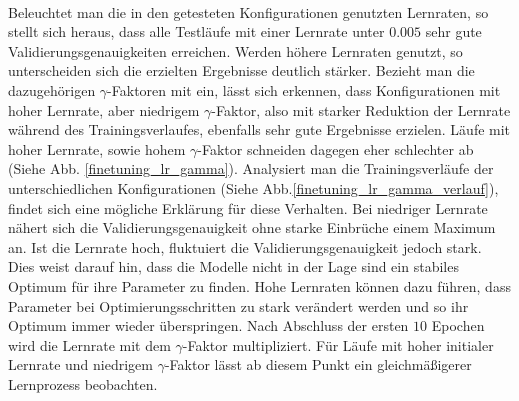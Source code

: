\\
Beleuchtet man die in den getesteten Konfigurationen genutzten Lernraten, so stellt sich heraus, dass alle Testläufe mit einer Lernrate unter $0.005$ sehr gute Validierungsgenauigkeiten erreichen. Werden höhere Lernraten genutzt, so unterscheiden sich die erzielten Ergebnisse deutlich stärker. Bezieht man die dazugehörigen $\gamma$-Faktoren mit ein, lässt sich erkennen, dass Konfigurationen mit hoher Lernrate, aber niedrigem $\gamma$-Faktor, also mit starker Reduktion der Lernrate während des Trainingsverlaufes, ebenfalls sehr gute Ergebnisse erzielen. Läufe mit hoher Lernrate, sowie hohem $\gamma$-Faktor schneiden dagegen eher schlechter ab (Siehe Abb. \ref{finetuning_lr_gamma}). Analysiert man die Trainingsverläufe der unterschiedlichen Konfigurationen (Siehe Abb.\ref{finetuning_lr_gamma_verlauf}), findet sich eine mögliche Erklärung für diese Verhalten. Bei niedriger Lernrate nähert sich die Validierungsgenauigkeit ohne starke Einbrüche einem Maximum an. Ist die Lernrate hoch, fluktuiert die Validierungsgenauigkeit jedoch stark. Dies weist darauf hin, dass die Modelle nicht in der Lage sind ein stabiles Optimum für ihre Parameter zu finden. Hohe Lernraten können dazu führen, dass Parameter bei Optimierungsschritten zu stark verändert werden und so ihr Optimum immer wieder überspringen. Nach Abschluss der ersten $10$ Epochen wird die Lernrate mit dem $\gamma$-Faktor multipliziert. Für Läufe mit hoher initialer Lernrate und niedrigem $\gamma$-Faktor lässt ab diesem Punkt ein gleichmäßigerer Lernprozess beobachten. 
